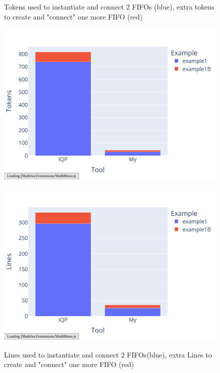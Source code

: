 \documentclass[12pt]{report}
\begin{document}
\begin{figure}[H] 
\begin{minipage}{.45\textwidth} 
   \caption{Tokens used to instantiate and connect 2 FIFOs (blue), extra tokens to create and "connect" one more FIFO (red)} 
   \includegraphics[width=\textwidth]{charts/example1_tokens.pdf} 
   \label{fig:sub1} 
   \centering 
\end{minipage}%
\hspace{0.5cm} 
\begin{minipage}{.45\textwidth} 
   \caption{Lines used to instantiate and connect 2 FIFOs(blue), extra Lines to create and "connect" one more FIFO (red)} 
   \includegraphics[width=\textwidth]{charts/example1_lines.pdf} 
   \label{fig:sub2} 
   \centering 
\end{minipage} 
\end{figure} 
\end{document}
